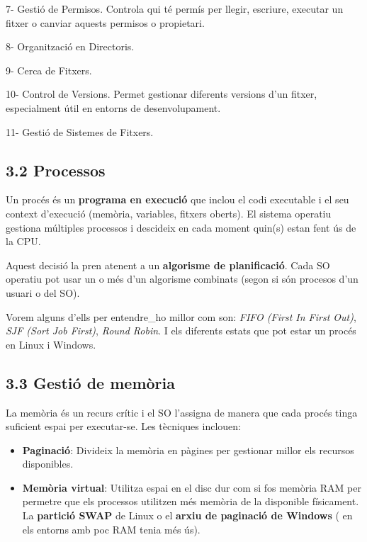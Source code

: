 \documentclass[
  a4paper,
]{article}
\begin{document}
7- Gestió de Permisos. Controla qui té permís per llegir, escriure,
executar un fitxer o canviar aquests permisos o propietari.

8- Organització en Directoris.

9- Cerca de Fitxers.

10- Control de Versions. Permet gestionar diferents versions d'un
fitxer, especialment útil en entorns de desenvolupament.

11- Gestió de Sistemes de Fitxers.

\subsection{3.2 Processos}\label{processos}

Un procés és un \textbf{programa en execució} que inclou el codi
executable i el seu context d'execució (memòria, variables, fitxers
oberts). El sistema operatiu gestiona múltiples processos i descideix en
cada moment quin(s) estan fent ús de la CPU.

Aquest decisió la pren atenent a un \textbf{algorisme de planificació}.
Cada SO operatiu pot usar un o més d'un algorisme combinats (segon si
són procesos d'un usuari o del SO).

Vorem alguns d'ells per entendre\_ho millor com son: \emph{FIFO (First
In First Out)}, \emph{SJF (Sort Job First)}, \emph{Round Robin}. I els
diferents estats que pot estar un procés en Linux i Windows.

\subsection{3.3 Gestió de memòria}\label{gestiuxf3-de-memuxf2ria}

La memòria és un recurs crític i el SO l'assigna de manera que cada
procés tinga suficient espai per executar-se. Les tècniques inclouen:

\begin{itemize}
\item
  \textbf{Paginació}: Divideix la memòria en pàgines per gestionar
  millor els recursos disponibles.
\item
  \textbf{Memòria virtual}: Utilitza espai en el disc dur com si fos
  memòria RAM per permetre que els processos utilitzen més memòria de la
  disponible físicament. La \textbf{partició SWAP} de Linux o el
  \textbf{arxiu de paginació de Windows} ( en els entorns amb poc RAM
  tenia més ús).
\end{itemize}
\end{document}
